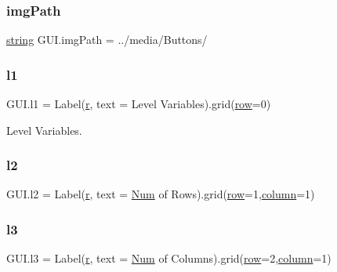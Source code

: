\mbox{\label{namespace_g_u_i_a293e22c0a27a45862ad50fcb8ed12f15}} 
\subsubsection{\texorpdfstring{imgPath}{imgPath}}
{\footnotesize\ttfamily \mbox{\hyperlink{asdl_8h_ae84541b4f3d8e1ea24ec0f466a8c568b}{string}} G\+U\+I.\+img\+Path = \textquotesingle{}../media/Buttons/\textquotesingle{}}

\mbox{\label{namespace_g_u_i_a95a82d369df3d4c7b727a9411b5200bf}} 
\subsubsection{\texorpdfstring{l1}{l1}}
{\footnotesize\ttfamily G\+U\+I.\+l1 = Label(\mbox{\hyperlink{_s_d_l__opengl_8h_a42ce7cdc612e53abee15043f80220d97}{r}}, text = \textquotesingle{}Level Variables\textquotesingle{}).grid(\mbox{\hyperlink{_s_d_l__opengl__glext_8h_a90d3e7e4182a9630993f640fa0443b0b}{row}}=0)}



Level Variables. 

\mbox{\label{namespace_g_u_i_ac7c465b5857043b3fa99979abb72f6f8}} 
\subsubsection{\texorpdfstring{l2}{l2}}
{\footnotesize\ttfamily G\+U\+I.\+l2 = Label(\mbox{\hyperlink{_s_d_l__opengl_8h_a42ce7cdc612e53abee15043f80220d97}{r}}, text = \textquotesingle{}\mbox{\hyperlink{_python-ast_8h_a8c8f50b76976c33a0eaa959e28d7b453}{Num}} of Rows\textquotesingle{}).grid(\mbox{\hyperlink{_s_d_l__opengl__glext_8h_a90d3e7e4182a9630993f640fa0443b0b}{row}}=1,\mbox{\hyperlink{_s_d_l__opengl__glext_8h_a0027cf4871ca9857e8e241960701189f}{column}}=1)}

\mbox{\label{namespace_g_u_i_a35519123b77b2a3bdeaaa694185dd02a}} 
\subsubsection{\texorpdfstring{l3}{l3}}
{\footnotesize\ttfamily G\+U\+I.\+l3 = Label(\mbox{\hyperlink{_s_d_l__opengl_8h_a42ce7cdc612e53abee15043f80220d97}{r}}, text = \textquotesingle{}\mbox{\hyperlink{_python-ast_8h_a8c8f50b76976c33a0eaa959e28d7b453}{Num}} of Columns\textquotesingle{}).grid(\mbox{\hyperlink{_s_d_l__opengl__glext_8h_a90d3e7e4182a9630993f640fa0443b0b}{row}}=2,\mbox{\hyperlink{_s_d_l__opengl__glext_8h_a0027cf4871ca9857e8e241960701189f}{column}}=1)}

